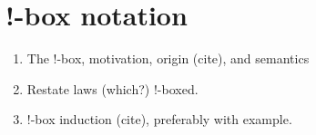 
\section{!-box notation}\label{sec:bangbox}

\begin{TODOLIST}
\begin{enumerate}
\item The !-box, motivation, origin (cite), and semantics
\item Restate laws (which?) !-boxed.
\item !-box induction (cite), preferably with example.
\end{enumerate}
\end{TODOLIST}
